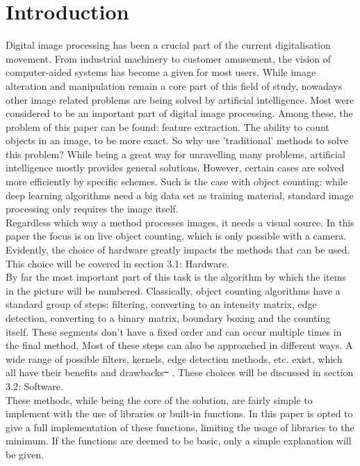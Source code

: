 \documentclass{article}
\providecommand{\DIFdeltex}[1]{{\protect\color{red}\sout{#1}}}                      %
\providecommand{\DIFaddbegin}{} %
\providecommand{\DIFaddend}{} %
\providecommand{\DIFdelbegin}{} %
\providecommand{\DIFdelend}{} %
\providecommand{\DIFdel}[1]{\texorpdfstring{\DIFdeltex{#1}}{}} %
\newcommand{\DIFscaledelfig}{0.5}
\newlength{\DIFdelgraphicswidth} %
\newlength{\DIFdelgraphicsheight} %
\newcommand{\DIFaddincludegraphics}[2][]{{\color{blue}\fbox{\DIFOincludegraphics[#1]{#2}}}} %
\newcommand{\DIFdelincludegraphics}[2][]{%
\sbox{\DIFdelgraphicsbox}{\DIFOincludegraphics[#1]{#2}}%
\settoboxwidth{\DIFdelgraphicswidth}{\DIFdelgraphicsbox} %
\settoboxtotalheight{\DIFdelgraphicsheight}{\DIFdelgraphicsbox} %
\scalebox{\DIFscaledelfig}{%
\parbox[b]{\DIFdelgraphicswidth}{\usebox{\DIFdelgraphicsbox}\\[-\baselineskip] \rule{\DIFdelgraphicswidth}{0em}}\llap{\resizebox{\DIFdelgraphicswidth}{\DIFdelgraphicsheight}{%
\setlength{\unitlength}{\DIFdelgraphicswidth}%
\begin{picture}(1,1)%
\thicklines\linethickness{2pt} %
{\color[rgb]{1,0,0}\put(0,0){\framebox(1,1){}}}%
{\color[rgb]{1,0,0}\put(0,0){\line( 1,1){1}}}%
{\color[rgb]{1,0,0}\put(0,1){\line(1,-1){1}}}%
\end{picture}%
}\hspace*{3pt}}} %
} %
\DeclareRobustCommand{\DIFaddbegin}{\DIFOaddbegin \let\includegraphics\DIFaddincludegraphics} %
\DeclareRobustCommand{\DIFaddend}{\DIFOaddend \let\includegraphics\DIFOincludegraphics} %
\DeclareRobustCommand{\DIFdelbegin}{\DIFOdelbegin \let\includegraphics\DIFdelincludegraphics} %
\DeclareRobustCommand{\DIFdelend}{\DIFOaddend \let\includegraphics\DIFOincludegraphics} %
\begin{document}


\newpage
\tableofcontents
\DIFdelbegin %
\DIFdelend \DIFaddbegin {}
\DIFaddend 


\newpage
\listoffigures
\DIFdelbegin %
\DIFdelend 

\newpage
\section{Introduction}
Digital image processing has been a crucial part of the current digitalisation movement. From industrial machinery to customer amusement, the vision of computer-aided systems has become a given for most users. While image alteration and manipulation remain a core part of this field of study, nowadays other image related problems are being solved by artificial intelligence. Most were considered to be an important part of digital image processing. Among these, the problem of this paper can be found: feature extraction. The ability to count objects in an image, to be more exact. So why use 'traditional' methods to solve this problem? While being a great way for unravelling many problems, artificial intelligence mostly provides general solutions. However, certain cases are solved more efficiently by specific schemes. Such is the case with object counting: while deep learning algorithms need a big data set as training material, standard image processing only requires the image itself.\\
Regardless which way a method processes images, it needs a visual source. In this paper the focus is on live object counting, which is only possible with a camera. Evidently, the choice of hardware greatly impacts the methods that can be used. This choice will be covered in section 3.1: Hardware.\\
By far the most important part of this task is the algorithm by which the items in the picture will be numbered. Classically, object counting algorithms have a standard group of steps: filtering, converting to an intensity matrix, edge detection, converting to a binary matrix, boundary boxing and the counting itself. These segments don't have a fixed order and can occur multiple times in the final method. Most of these steps can also be approached in different ways. A wide range of possible filters, kernels, edge detection methods, etc. exist, which all have their benefits and drawbacks\DIFdelbegin \DIFdel{\mbox{%
\cite{dirac}}\hspace{0pt}%
}\DIFdelend . These choices will be discussed in section 3.2: Software.\\
These methods, while being the core of the solution, are fairly simple to implement with the use of libraries or built-in functions. In this paper is opted to give a full implementation of these functions, limiting the usage of libraries to the minimum. If the functions are deemed to be basic, only a simple explanation will be given.
\end{document}
